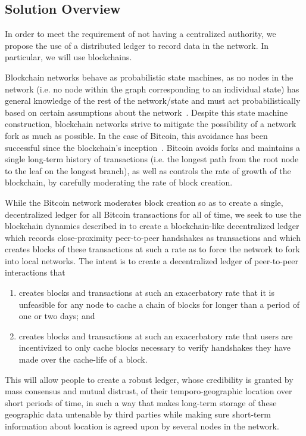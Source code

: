 \subsection{Solution Overview}

In order to meet the requirement of not having a centralized authority,
we propose the use of a distributed ledger to record data in the network.
In particular, we will use blockchains.

Blockchain networks behave as probabilistic state machines, as no nodes in the
network (i.e. no node within the graph corresponding to an individual state) has
general knowledge of the rest of the network/state and must act probabilistically
based on certain assumptions about the network~\cite{saito_2016}. Despite this
state machine construction, blockchain networks strive to mitigate the
possibility of a network fork as much as possible. In the case of Bitcoin, this
avoidance has been successful since the blockchain's inception~\cite{decker_2013}.
Bitcoin avoids forks and maintains a single long-term history of transactions
(i.e. the longest path from the root node to the leaf on the longest branch), as
well as controls the rate of growth of the blockchain, by carefully moderating
the rate of block creation.

While the Bitcoin network moderates block creation so as to create a single,
decentralized ledger for all Bitcoin transactions for all of time, we seek to use
the blockchain dynamics described in \cite{decker_2013} to create a
blockchain-like decentralized ledger which records close-proximity peer-to-peer
handshakes as transactions and which creates blocks of these transactions at such
a rate as to force the network to fork into local networks. The intent is to
create a decentralized ledger of peer-to-peer interactions that
\begin{enumerate}
	\item creates blocks and transactions at such an exacerbatory rate that
		it is unfeasible for any node to cache a chain of blocks for
		longer than a period of one or two days; and
	\item creates blocks and transactions at such an exacerbatory rate that
		users are incentivized to only cache blocks necessary to verify
		handshakes they have made over the cache-life of a block.
\end{enumerate}

This will allow people to create a robust ledger, whose
credibility is granted by mass consensus and mutual distrust, of their temporo-geographic
location over short periods of time, in such a way that makes long-term storage of these
geographic data untenable by third parties while making sure short-term
information about location is agreed upon by several nodes in the network.
